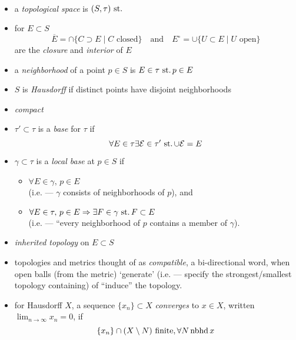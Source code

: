 \begin{defn}\
  \begin{itemize}
  \item
    a \emph{topological space} is ${(S,\tau)\operatorname{\,st.}}$
  \item
    for ${E\subset S}$
    \[
    \overline E = \cap\{C\supset E\mid C\text{ closed}\}
    \quad\text{and}\quad
    E^\circ = \cup\{U\subset E\mid U\text{ open}\}
    \]
    are the \emph{closure} and \emph{interior} of $E$
  \item
    a \emph{neighborhood} of a point ${p\in S}$ is
    ${E\in\tau\operatorname{\,st.} p\in E}$
  \item
    $S$ is \emph{Hausdorff} if distinct points have
    disjoint neighborhoods
  \item
    \emph{compact}
  \item
    ${\tau'\subset\tau}$ is a \emph{base} for $\tau$ if
    \[ \forall E\in\tau\exists\mathcal{E}\in\tau'\operatorname{\,st.}\cup\mathcal{E}=E \]
  \item
    ${\gamma\subset\tau}$ is a \emph{local base} at ${p\in S}$ if
    \begin{itemize}
    \item ${\forall E\in\gamma,\, p\in E}$\\
      (i.e. --- $\gamma$ consists of neighborhoods of $p$), and
    \item ${\forall E\in\tau,\,p\in E\Rightarrow\exists F\in\gamma\operatorname{\,st.} F\subset E}$\\
      (i.e. --- ``every neighborhood of $p$ contains a member
      of $\gamma$).
    \end{itemize}
  \item
    \emph{inherited topology} on ${E\subset S}$
  \item
    topologies and metrics thought of as \emph{compatible},
    a bi-directional word, when open balls
    (from the metric) `generate'
    (i.e. --- specify the strongest/smallest topology containing)
    of ``induce'' the topology.
  \item
    for Hausdorff $X$, a sequence ${\{x_n\}\subset X}$ \emph{converges}
    to ${x\in X}$, written ${\lim_{n\rightarrow\infty} x_n = 0}$, if
    \[ \{x_n\}\cap(X\setminus N)\text{ finite} , \forall N \operatorname{nbhd} x \]
  \end{itemize}
\end{defn}

